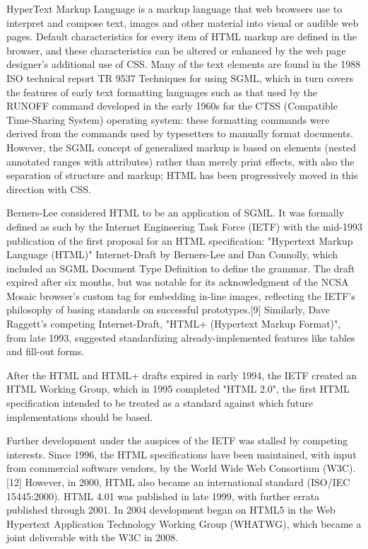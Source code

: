 HyperText Markup Language is a markup language that web browsers use to interpret and compose text, images and other material into visual or audible web pages. Default characteristics for every item of HTML markup are defined in the browser, and these characteristics can be altered or enhanced by the web page designer's additional use of CSS. Many of the text elements are found in the 1988 ISO technical report TR 9537 Techniques for using SGML, which in turn covers the features of early text formatting languages such as that used by the RUNOFF command developed in the early 1960s for the CTSS (Compatible Time-Sharing System) operating system: these formatting commands were derived from the commands used by typesetters to manually format documents. However, the SGML concept of generalized markup is based on elements (nested annotated ranges with attributes) rather than merely print effects, with also the separation of structure and markup; HTML has been progressively moved in this direction with CSS.



Berners-Lee considered HTML to be an application of SGML. It was formally defined as such by the Internet Engineering Task Force (IETF) with the mid-1993 publication of the first proposal for an HTML specification: "Hypertext Markup Language (HTML)" Internet-Draft by Berners-Lee and Dan Connolly, which included an SGML Document Type Definition to define the grammar. The draft expired after six months, but was notable for its acknowledgment of the NCSA Mosaic browser's custom tag for embedding in-line images, reflecting the IETF's philosophy of basing standards on successful prototypes.[9] Similarly, Dave Raggett's competing Internet-Draft, "HTML+ (Hypertext Markup Format)", from late 1993, suggested standardizing already-implemented features like tables and fill-out forms.


After the HTML and HTML+ drafts expired in early 1994, the IETF created an HTML Working Group, which in 1995 completed "HTML 2.0", the first HTML specification intended to be treated as a standard against which future implementations should be based.

Further development under the auspices of the IETF was stalled by competing interests. Since 1996, the HTML specifications have been maintained, with input from commercial software vendors, by the World Wide Web Consortium (W3C).[12] However, in 2000, HTML also became an international standard (ISO/IEC 15445:2000). HTML 4.01 was published in late 1999, with further errata published through 2001. In 2004 development began on HTML5 in the Web Hypertext Application Technology Working Group (WHATWG), which became a joint deliverable with the W3C in 2008.

